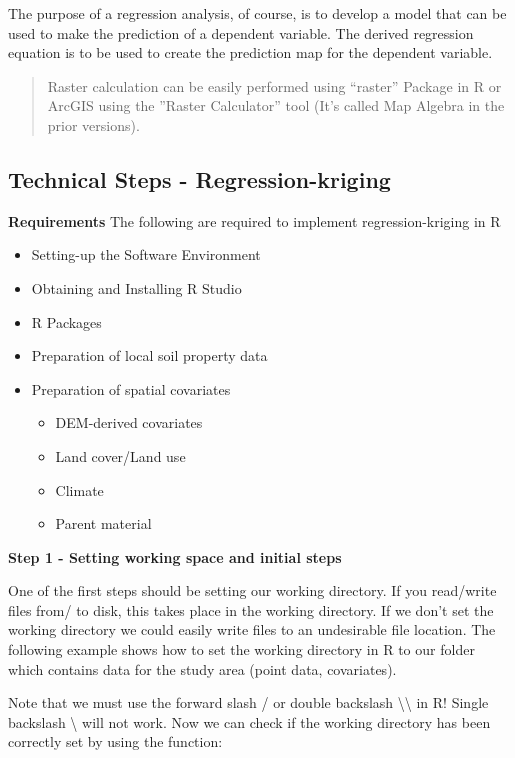 \documentclass[10pt,b5paper,]{book}
\theoremstyle{definition}
\theoremstyle{definition}
\theoremstyle{definition}
\theoremstyle{remark}
\begin{document}
The purpose of a regression analysis, of course, is to develop a model
that can be used to make the prediction of a dependent variable. The
derived regression equation is to be used to create the prediction map
for the dependent variable.

\begin{quote}
Raster calculation can be easily performed using ``raster'' Package in R
or ArcGIS using the ''Raster Calculator'' tool (It's called Map Algebra
in the prior versions).
\end{quote}

\hypertarget{technical-steps---regression-kriging}{%
\subsection{Technical Steps -
Regression-kriging}\label{technical-steps---regression-kriging}}

\textbf{Requirements} The following are required to implement
regression-kriging in R

\begin{itemize}
\item
  Setting-up the Software Environment
\item
  Obtaining and Installing R Studio
\item
  R Packages
\item
  Preparation of local soil property data
\item
  Preparation of spatial covariates

  \begin{itemize}
  \item
    DEM-derived covariates
  \item
    Land cover/Land use
  \item
    Climate
  \item
    Parent material
  \end{itemize}
\end{itemize}

\textbf{Step 1 - Setting working space and initial steps}

One of the first steps should be setting our working directory. If you
read/write files from/ to disk, this takes place in the working
directory. If we don't set the working directory we could easily write
files to an undesirable file location. The following example shows how
to set the working directory in R to our folder which contains data for
the study area (point data, covariates).

Note that we must use the forward slash / or double backslash
\textbackslash{}\textbackslash{} in R! Single backslash \textbackslash{}
will not work. Now we can check if the working directory has been
correctly set by using the function:
\end{document}
